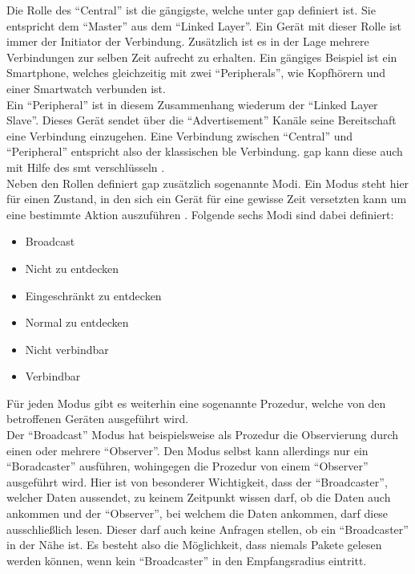 \noindent Die Rolle des "`Central"' ist die gängigste, welche unter \ac{gap} definiert ist. Sie entspricht dem "`Master"' aus dem "`Linked Layer"'. Ein Gerät mit dieser Rolle ist immer der Initiator der Verbindung. Zusätzlich ist es in der Lage mehrere Verbindungen zur selben Zeit aufrecht zu erhalten. Ein gängiges Beispiel ist ein Smartphone, welches gleichzeitig mit zwei "`Peripherals"', wie Kopfhörern und einer Smartwatch verbunden ist.\\

\noindent Ein "`Peripheral"' ist in diesem Zusammenhang wiederum der "`Linked Layer Slave"'. Dieses Gerät sendet über die "`Advertisement"' Kanäle seine Bereitschaft eine Verbindung einzugehen. Eine Verbindung zwischen "`Central"' und "`Peripheral"' entspricht also der klassischen \ac{ble} Verbindung. \ac{gap} kann diese auch mit Hilfe des \ac{smt} verschlüsseln \cite[Seite 34]{Usama17:BBS}.\\  

\noindent Neben den Rollen definiert \ac{gap} zusätzlich sogenannte Modi. Ein Modus steht hier für einen Zustand, in den sich ein Gerät für eine gewisse Zeit versetzten kann um eine bestimmte Aktion auszuführen \cite[Seite 35]{Townsend14:GSB}. Folgende sechs Modi sind dabei definiert:
\begin{itemize}
	\item{Broadcast}
	\item{Nicht zu entdecken}
	\item{Eingeschränkt zu entdecken}
	\item{Normal zu entdecken}
	\item{Nicht verbindbar}
	\item{Verbindbar}
\end{itemize} 
Für jeden Modus gibt es weiterhin eine sogenannte Prozedur, welche von den betroffenen Geräten ausgeführt wird.\\

\noindent Der "`Broadcast"' Modus hat beispielsweise als Prozedur die Observierung durch einen oder mehrere "`Observer"'. Den Modus selbst kann allerdings nur ein "`Boradcaster"' ausführen, wohingegen die Prozedur von einem "`Observer"' ausgeführt wird. Hier ist von besonderer Wichtigkeit, dass der "`Broadcaster"', welcher Daten aussendet, zu keinem Zeitpunkt wissen darf, ob die Daten auch ankommen und der "`Observer"', bei welchem die Daten ankommen, darf diese ausschließlich lesen. Dieser darf auch keine Anfragen stellen, ob ein "`Broadcaster"' in der Nähe ist. Es besteht also die Möglichkeit, dass niemals Pakete gelesen werden können, wenn kein "`Broadcaster"' in den Empfangsradius eintritt.\\


